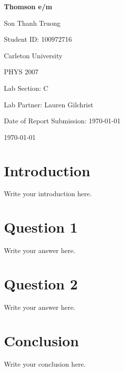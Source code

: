 \documentclass[12pt,letterpaper]{article}
\begin{document}
\begin{titlepage}
    \centering
    \vspace*{3cm}

    {\Huge\bfseries Thomson e/m\par}

    \vspace{2cm}

    {\Large Son Thanh Truong\par}
    {\Large Student ID: 100972716\par}
    \vspace{0.5cm}
    {\large Carleton University\par}
    {\large PHYS 2007\par}
    {\large Lab Section: C\par}
    {\large Lab Partner: Lauren Gilchrist\par}
    {\large Date of Report Submission: \today\par}
    
    
    \vfill

    {\large \today\par}
\end{titlepage}




\section{Introduction}

Write your introduction here.

\section{Question 1}

Write your answer here.



\section{Question 2}

Write your answer here.

%

\section{Conclusion}

Write your conclusion here.
\end{document}
